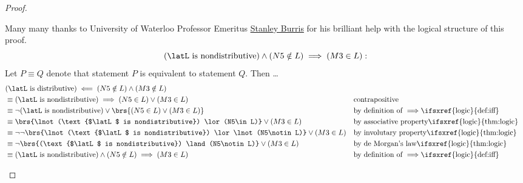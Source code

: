 \begin{proof}
\begin{enumerate}
\begin{enumerate}
{%
%
%
            Many many thanks to University of Waterloo Professor Emeritus
            \href{http://www.thoralf.uwaterloo.ca}{Stanley Burris}
            for his brilliant help with the logical structure of this proof.
        }
          \[ (\text{$\latL$ is nondistributive}) \land (N5\notin L) \implies (M3\in L): \]
        Let $P\equiv Q$ denote that statement $P$ is equivalent to statement $Q$. Then \ldots
        \begin{align*}
          &\text{($\latL$ is distributive)} \impliedby (N5\notin L) \land (M3\notin L)
          \\&\equiv \text{($\latL$ is nondistributive)} \implies (N5\in L) \lor (M3\in L)
            && \text{contrapositive}
          \\&\equiv \lnot(\text{$\latL$ is nondistributive}) \lor \brs{(N5\in L) \lor (M3\in L)}
            && \text{by definition of $\implies$\ifsxref{logic}{def:iff}}
          \\&\equiv \brs{\lnot(\text{$\latL$ is nondistributive}) \lor (N5\in L)} \lor (M3\in L)
            && \text{by associative property\ifsxref{logic}{thm:logic}}
          \\&\equiv \lnot\lnot\brs{\lnot(\text{$\latL$ is nondistributive}) \lor \lnot(N5\notin L)} \lor (M3\in L)
            && \text{by involutary property\ifsxref{logic}{thm:logic}}
          \\&\equiv \lnot\brs{(\text{$\latL$ is nondistributive}) \land (N5\notin L)} \lor (M3\in L)
            && \text{by de Morgan's law\ifsxref{logic}{thm:logic}}
          \\&\equiv (\text{$\latL$ is nondistributive}) \land (N5\notin L) \implies (M3\in L)
            && \text{by definition of $\implies$\ifsxref{logic}{def:iff}}
        \end{align*}


\end{enumerate}
\end{enumerate}
\end{proof}
